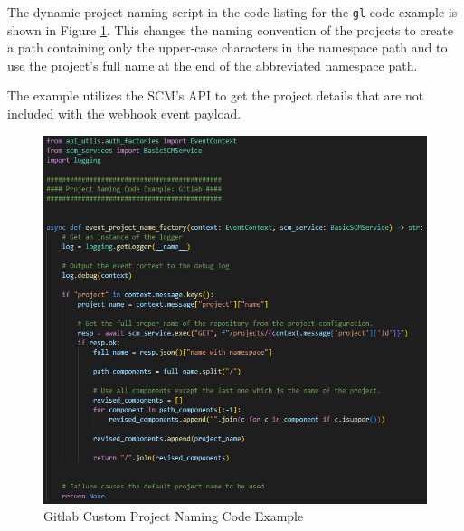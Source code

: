 The dynamic project naming script in the code listing for the \texttt{gl}
code example is shown in Figure \ref{fig:naming-code-gl}.  This changes the naming convention of the projects to create
a path containing only the upper-case characters in the namespace path and to use
the project's full name at the end of the abbreviated namespace path.

The example utilizes the SCM's API to get the project details that are not included
with the webhook event payload.\\

\begin{figure}[h]
    \includegraphics[width=\textwidth]{graphics/naming-code-gl.png}
    \caption{Gitlab Custom Project Naming Code Example}
    \label{fig:naming-code-gl}
\end{figure}
